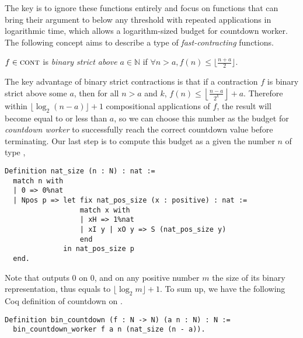 The key is to ignore these functions entirely and focus on functions that can bring their argument to below any threshold with repeated applications in logarithmic time, which allows a logarithm-sized budget for countdown worker. The following concept aims to describe a type of \emph{fast-contracting} functions.
\begin{defn} \label{defn: bin-contraction}
	$f\in \text{\scshape{cont}}$ is \emph{binary strict above} $a\in \mathbb{N}$ if $\forall n > a, f(n) \le \lfloor \frac{n + a}{2} \rfloor$.
\end{defn}
The key advantage of binary strict contractions is that if a contraction $f$ is binary strict above some $a$, then for all $n > a$ and $k$,
$f(n) \le \left\lfloor \frac{n - a}{2^k} \right\rfloor + a$.
Therefore within $\lfloor \log_2 (n - a) \rfloor + 1$ compositional applications of $f$, the result will become equal to or less than $a$, so we can choose this number as the budget for \emph{countdown worker} to successfully reach the correct countdown value before terminating. Our last step is to compute this budget as a  given the number $n$ of type , 
\begin{lstlisting}
Definition nat_size (n : N) : nat :=
  match n with
  | 0 => 0%nat
  | Npos p => let fix nat_pos_size (x : positive) : nat :=
                  match x with
                  | xH => 1%nat
                  | xI y | xO y => S (nat_pos_size y) 
                  end
              in nat_pos_size p
  end.
\end{lstlisting}
Note that  outputs $0$ on $0$, and on any positive number $m$ the size of its binary representation, thus equals to $\lfloor \log_{2} m \rfloor + 1$.
To sum up, we have the following Coq definition of countdown on .
\begin{lstlisting}
Definition bin_countdown (f : N -> N) (a n : N) : N := 
  bin_countdown_worker f a n (nat_size (n - a)).
\end{lstlisting}

